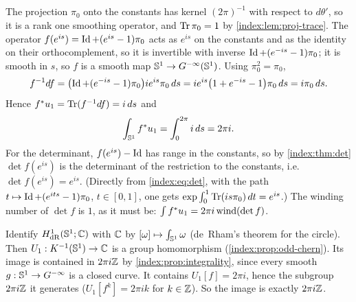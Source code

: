 \subsection*{}
The projection $\pi_0$ onto the constants has kernel $(2\pi)^{-1}$ with respect to
$d\theta'$, so it is a rank one smoothing operator, and $\operatorname{Tr}\pi_0=1$ by
\cref{index:lem:proj-trace}. The operator $f(e^{is})=\operatorname{Id}+(e^{is}-1)\pi_0$ acts as
$e^{is}$ on the constants and as the identity on their orthocomplement, so it is
invertible with inverse $\operatorname{Id}+(e^{-is}-1)\pi_0$; it is smooth in $s$, so $f$ is a
smooth map $\mathbb{S}^1\to G^{-\infty}(\mathbb{S}^1)$. Using $\pi_0^2=\pi_0$,
\begin{equation*}
  f^{-1}df=\bigl(\operatorname{Id}+(e^{-is}-1)\pi_0\bigr)ie^{is}\pi_0\,ds
  =ie^{is}\bigl(1+e^{-is}-1\bigr)\pi_0\,ds=i\pi_0\,ds .
\end{equation*}
Hence $f^*u_1=\operatorname{Tr}(f^{-1}df)=i\,ds$ and
\begin{equation*}
  \int_{\mathbb{S}^1}f^*u_1=\int_0^{2\pi}i\,ds=2\pi i .
\end{equation*}
For the determinant, $f(e^{is})-\operatorname{Id}$ has range in the constants, so by
\cref{index:thm:det} $\det f(e^{is})$ is the determinant of the restriction to the
constants, i.e.\ $\det f(e^{is})=e^{is}$. (Directly from \eqref{index:eq:det}, with the
path $t\mapsto\operatorname{Id}+(e^{its}-1)\pi_0$, $t\in[0,1]$, one gets
$\exp\int_0^1\operatorname{Tr}(is\pi_0)\,dt=e^{is}$.) The winding number of $\det f$ is $1$, as it
must be: $\int f^*u_1=2\pi i\operatorname{wind}(\det f)$.

Identify $H^1_{\mathrm{dR}}(\mathbb{S}^1;\mathbb{C})$ with $\mathbb{C}$ by $[\omega]\mapsto\int_{\mathbb{S}^1}\omega$
(de~Rham's theorem for the circle). Then $U_1:K^{-1}(\mathbb{S}^1)\to\mathbb{C}$ is a group
homomorphism (\cref{index:prop:odd-chern}). Its image is contained in $2\pi i\mathbb{Z}$ by
\cref{index:prop:integrality}, since every smooth $g:\mathbb{S}^1\to G^{-\infty}$ is a closed
curve. It contains $U_1[f]=2\pi i$, hence the subgroup $2\pi i\mathbb{Z}$ it generates
($U_1[f^k]=2\pi ik$ for $k\in\mathbb{Z}$). So the image is exactly $2\pi i\mathbb{Z}$.

